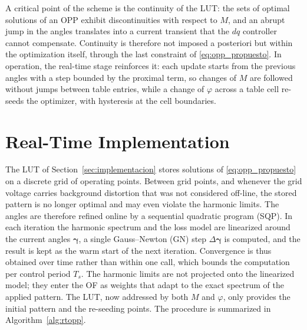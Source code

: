 \documentclass[conference]{IEEEtran}
\newcommand{\gv}{\boldsymbol{\gamma}}
\begin{document}
A critical point of the scheme is the continuity of the LUT: the sets of optimal
solutions of an OPP exhibit discontinuities with respect to $M$, and an abrupt
jump in the angles translates into a current transient that the $dq$ controller
cannot compensate. Continuity is therefore not imposed a posteriori but within
the optimization itself, through the last constraint of
\eqref{eq:opp_propuesto}. In operation, the real-time stage reinforces it:
each update starts from the previous angles with a step bounded by the
proximal term, so changes of $M$ are followed without jumps between table
entries, while a change of $\varphi$ across a table cell re-seeds the
optimizer, with hysteresis at the cell boundaries.


\section{Real-Time Implementation}
\label{sec:rt}

The LUT of Section~\ref{sec:implementacion} stores solutions of
\eqref{eq:opp_propuesto} on a discrete grid of operating points. Between
grid points, and whenever the grid voltage carries background distortion
that was not considered off-line, the stored pattern is no longer optimal
and may even violate the harmonic limits. The angles are therefore refined
online by a sequential quadratic program (SQP). In each iteration the
harmonic spectrum and the loss model are linearized around the current
angles $\gv$, a single Gauss--Newton (GN) step $\Delta\gv$ is computed,
and the result is kept as the warm start of the next iteration. Convergence is thus obtained over time rather than
within one call, which bounds the computation per control period $T_s$.
The harmonic limits are not projected onto
the linearized model; they enter the OF as weights that adapt to the exact
spectrum of the applied pattern. The LUT, now addressed by both $M$ and
$\varphi$, only provides the initial pattern and the re-seeding points.
The procedure is summarized in Algorithm~\ref{alg:rtopp}.
\end{document}
